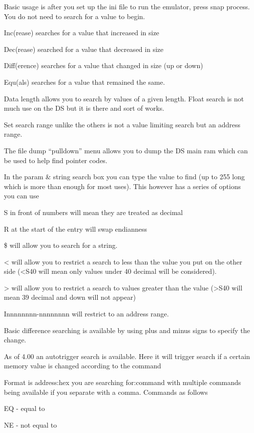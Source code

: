 \documentclass[
]{book}
\begin{document}
Basic usage is after you set up the ini file to run the emulator, press snap process. You do not need to search for a value to begin.

Inc(rease) searches for a value that increased in size

Dec(rease) searched for a value that decreased in size

Diff(erence) searches for a value that changed in size (up or down)

Equ(als) searches for a value that remained the same.

Data length allows you to search by values of a given length. Float search is not much use on the DS but it is there and sort of works.

Set search range unlike the others is not a value limiting search but an address range.

The file dump ``pulldown'' menu allows you to dump the DS main ram which can be used to help find pointer codes.

In the param \& string search box you can type the value to find (up to 255 long which is more than enough for most uses). This however has a series of options you can use

S in front of numbers will mean they are treated as decimal

R at the start of the entry will swap endianness

\$ will allow you to search for a string.

\textless{} will allow you to restrict a search to less than the value you put on the other side (\textless S40 will mean only values under 40 decimal will be considered).

\textgreater{} will allow you to restrict a search to values greater than the value (\textgreater S40 will mean 39 decimal and down will not appear)

Innnnnnnn-nnnnnnnn will restrict to an address range.

Basic difference searching is available by using plus and minus signs to specify the change.

As of 4.00 an autotrigger search is available. Here it will trigger search if a certain memory value is changed according to the command

Format is address:hex you are searching for:command with multiple commands being available if you separate with a comma. Commands as follows

EQ - equal to

NE - not equal to
\end{document}
